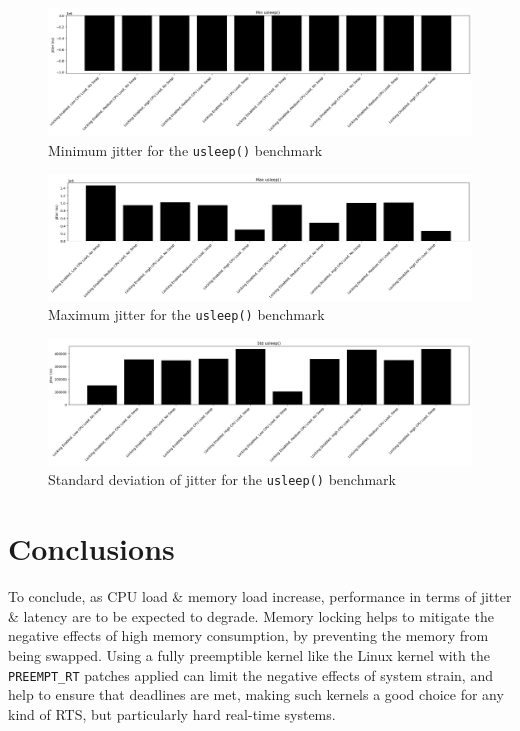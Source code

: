\documentclass[a4paper]{article}
\begin{document}
\begin{figure}[H]
    \centering
    \includegraphics[width=\textwidth]{./images/usleep-min.png}
    \caption{Minimum jitter for the \texttt{usleep()} benchmark}
\end{figure}

\begin{figure}[H]
    \centering
    \includegraphics[width=\textwidth]{./images/usleep-max.png}
    \caption{Maximum jitter for the \texttt{usleep()} benchmark}
\end{figure}

\begin{figure}[H]
    \centering
    \includegraphics[width=\textwidth]{./images/usleep-std.png}
    \caption{Standard deviation of jitter for the \texttt{usleep()} benchmark}
\end{figure}

\section{Conclusions}
To conclude, as CPU load \& memory load increase, performance in terms of jitter \& latency are to be expected to degrade.
Memory locking helps to mitigate the negative effects of high memory consumption, by preventing the memory from being swapped.
Using a fully preemptible kernel like the Linux kernel with the \verb|PREEMPT_RT| patches applied can limit the negative effects of system strain, and help to ensure that deadlines are met, making such kernels a good choice for any kind of RTS, but particularly hard real-time systems.

\printbibliography
\end{document}
